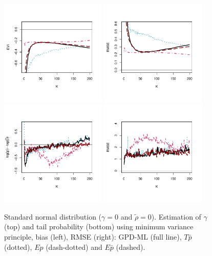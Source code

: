  \begin{figure}[!ht]
 \centering
\includegraphics[width=0.45\textwidth]{./plots/paper3/std_normalGPD_evi.pdf} 
\includegraphics[width=0.45\textwidth]{./plots/paper3/std_normalGPD_rmse.pdf} \\
\includegraphics[width=0.45\textwidth]{./plots/paper3/std_normalGPD_tail.pdf}
\includegraphics[width=0.45\textwidth]{./plots/paper3/std_normalGPD_tail_rmse.pdf} 
 \caption{ Standard normal distribution ($\gamma=0$ and $\tilde\rho=0$). Estimation of $\gamma$ (top) and tail probability (bottom) using minimum variance principle, bias (left), RMSE (right): GPD-ML (full line), $T\bar{p}$ (dotted), $Ep$ (dash-dotted) and $E\bar{p}$ (dashed).}
\label{paper3:fig6}
\end{figure}

